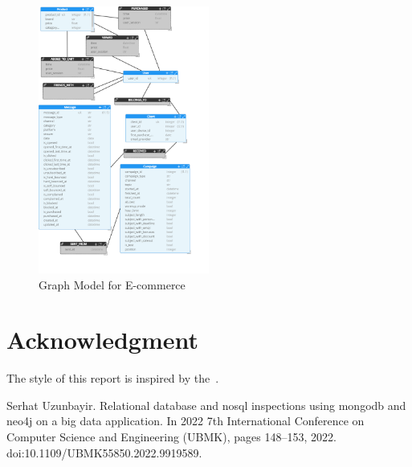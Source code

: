 \documentclass[conference]{IEEEtran}
\begin{document}
\begin{figure}[htbp]
    \centerline{\includegraphics[width=0.5\textwidth]{../screenshots/Neo4jModelER.png}}
    \caption{Graph Model for E-commerce}\label{fig:neo4j_ermodel}
\end{figure}

\section*{Acknowledgment}

The style of this report is inspired by the~\cite{uzunbayir}.



\begin{thebibliography}{00}
     Serhat Uzunbayir. Relational database and nosql inspections using mongodb and neo4j on a big data application.
    In 2022 7th International Conference on Computer Science and Engineering (UBMK), pages 148--153, 2022.
    doi:10.1109/UBMK55850.2022.9919589.
\end{thebibliography}
\end{document}
